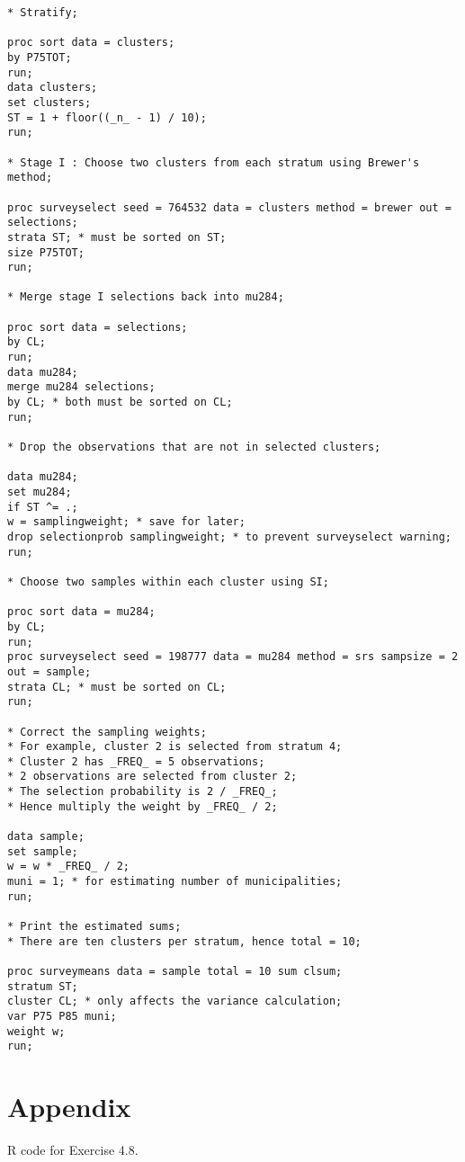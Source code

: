 \documentclass[12pt]{article}
\begin{document}
\begin{verbatim}
* Stratify;

proc sort data = clusters;
by P75TOT;
run;
data clusters;
set clusters;
ST = 1 + floor((_n_ - 1) / 10);
run;

* Stage I : Choose two clusters from each stratum using Brewer's method;

proc surveyselect seed = 764532 data = clusters method = brewer out = selections;
strata ST; * must be sorted on ST;
size P75TOT;
run;

* Merge stage I selections back into mu284;

proc sort data = selections;
by CL;
run;
data mu284;
merge mu284 selections;
by CL; * both must be sorted on CL;
run;

* Drop the observations that are not in selected clusters;

data mu284;
set mu284;
if ST ^= .;
w = samplingweight; * save for later;
drop selectionprob samplingweight; * to prevent surveyselect warning;
run;

* Choose two samples within each cluster using SI;

proc sort data = mu284;
by CL;
run;
proc surveyselect seed = 198777 data = mu284 method = srs sampsize = 2 out = sample;
strata CL; * must be sorted on CL;
run;

* Correct the sampling weights;
* For example, cluster 2 is selected from stratum 4;
* Cluster 2 has _FREQ_ = 5 observations;
* 2 observations are selected from cluster 2;
* The selection probability is 2 / _FREQ_;
* Hence multiply the weight by _FREQ_ / 2;

data sample;
set sample;
w = w * _FREQ_ / 2;
muni = 1; * for estimating number of municipalities;
run;

* Print the estimated sums;
* There are ten clusters per stratum, hence total = 10;

proc surveymeans data = sample total = 10 sum clsum;
stratum ST;
cluster CL;	* only affects the variance calculation;
var P75 P85 muni;
weight w;
run;
\end{verbatim}


\section*{Appendix}

R code for Exercise 4.8.
\end{document}
